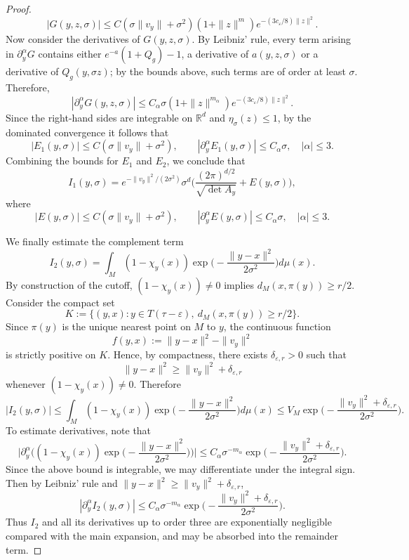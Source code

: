 \documentclass[11pt]{article}
\theoremstyle{plain}
\theoremstyle{definition}
\begin{document}
\begin{proof}
\[
|G(y,z,\sigma)|
\le
C(\sigma\|v_y\|+\sigma^2)(1+\|z\|^m)e^{-(3c_\varepsilon/8)\|z\|^2}.
\]
Now consider the derivatives of $G(y,z,\sigma)$. By Leibniz’ rule, every term arising in $\partial^\alpha_y G$ contains either $e^{-a}(1+Q_g)-1$, a derivative of $a(y,z,\sigma)$ or a derivative of $Q_g(y,\sigma z)$; by the bounds above, such terms are of order at least $\sigma$. Therefore, 
\[
|\partial_y^\alpha G(y,z,\sigma)|
\le
C_\alpha \sigma (1+\|z\|^{m_\alpha})e^{-(3c_\varepsilon/8)\|z\|^2}.
\]
Since the right-hand sides are integrable on $\mathbb R^d$ and $\eta_\sigma(z)\le 1$, by the dominated convergence it follows that
\[
|E_1(y,\sigma)|\le C(\sigma\|v_y\|+\sigma^2),
\qquad
|\partial_y^\alpha E_1(y,\sigma)|\le C_\alpha \sigma,\quad |\alpha|\le 3.
\]
Combining the bounds for $E_1$ and $E_2$, we conclude that
\[
I_1(y,\sigma)
=
e^{-\|v_y\|^2/(2\sigma^2)}\sigma^d
\big(
\frac{(2\pi)^{d/2}}{\sqrt{\det A_y}}+E(y,\sigma)
\big),
\]
where
\[
|E(y,\sigma)|\le C(\sigma\|v_y\|+\sigma^2),
\qquad
|\partial_y^\alpha E(y,\sigma)|\le C_\alpha \sigma,\quad |\alpha|\le 3.
\]

We finally estimate the complement term
\[
I_2(y,\sigma)
=
\int_M (1-\chi_y(x))
\exp\big(-\frac{\|y-x\|^2}{2\sigma^2}\big)d\mu(x).
\]
By construction of the cutoff, $(1-\chi_y(x))\neq 0$ implies $d_M(x,\pi(y))\ge r/2$.
Consider the compact set
\[
K:=\{(y,x): y\in T(\tau-\varepsilon),\ d_M(x,\pi(y))\ge r/2\}.
\]
Since $\pi(y)$ is the unique nearest point on $M$ to $y$, the continuous function
\[
f(y,x):=\|y-x\|^2-\|v_y\|^2
\]
is strictly positive on $K$. Hence, by compactness, there exists $\delta_{\varepsilon,r}>0$ such that
\[
\|y-x\|^2\ge \|v_y\|^2+\delta_{\varepsilon,r}
\]
whenever $(1-\chi_y(x))\neq 0$.
Therefore
\[
|I_2(y,\sigma)|
\le
\int_M (1-\chi_y(x))
\exp\big(-\frac{\|y-x\|^2}{2\sigma^2}\big)d\mu(x)
\le
V_M
\exp\big(-\frac{\|v_y\|^2+\delta_{\varepsilon,r}}{2\sigma^2}\big).
\]
To estimate derivatives, note that
\[
\Big|\partial_y^\alpha\Big(
(1-\chi_y(x))
\exp\big(-\frac{\|y-x\|^2}{2\sigma^2}\big)
\Big)\Big|
\le
C_\alpha \sigma^{-m_\alpha}
\exp\big(-\frac{\|v_y\|^2+\delta_{\varepsilon,r}}{2\sigma^2}\big).
\]
Since the above bound is integrable, we may differentiate under the integral sign. Then by Leibniz' rule and $\|y-x\|^2\ge \|v_y\|^2+\delta_{\varepsilon,r}$, 
\[
|\partial_y^\alpha I_2(y,\sigma)|
\le
C_\alpha \sigma^{-m_\alpha}
\exp\big(-\frac{\|v_y\|^2+\delta_{\varepsilon,r}}{2\sigma^2}\big).
\]
Thus $I_2$ and all its derivatives up to order three are exponentially negligible compared with the
main expansion, and may be absorbed into the remainder term.


\end{proof}
\end{document}
